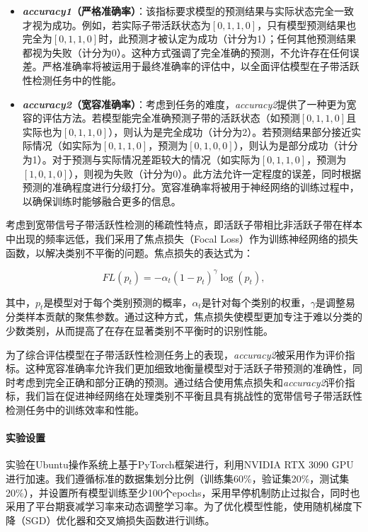\begin{itemize}
    \item \textbf{\textit{accuracy1}（严格准确率）}：该指标要求模型的预测结果与实际状态完全一致才视为成功。例如，若实际子带活跃状态为$[0, 1, 1, 0]$，只有模型预测结果也完全为$[0, 1, 1, 0]$时，此预测才被认定为成功（计分为1）；任何其他预测结果都视为失败（计分为0）。这种方式强调了完全准确的预测，不允许存在任何误差。严格准确率将被运用于最终准确率的评估中，以全面评估模型在子带活跃性检测任务中的性能。
    
    \item \textbf{\textit{accuracy2}（宽容准确率）}：考虑到任务的难度，\textit{accuracy2}提供了一种更为宽容的评估方法。若模型能完全准确预测子带的活跃状态（如预测$[0, 1, 1, 0]$且实际也为$[0, 1, 1, 0]$），则认为是完全成功（计分为2）。若预测结果部分接近实际情况（如实际为$[0, 1, 1, 0]$，预测为$[0, 1, 0, 0]$），则认为是部分成功（计分为1）。对于预测与实际情况差距较大的情况（如实际为$[0, 1, 1, 0]$，预测为$[1, 0, 1, 0]$），则视为失败（计分为0）。此方法允许一定程度的误差，同时根据预测的准确程度进行分级打分。宽容准确率将被用于神经网络的训练过程中，以确保训练时能够融合更多的信息。
\end{itemize}


考虑到宽带信号子带活跃性检测的稀疏性特点，即活跃子带相比非活跃子带在样本中出现的频率远低，我们采用了焦点损失（Focal Loss）作为训练神经网络的损失函数，以解决类别不平衡的问题。焦点损失的表达式为：

\begin{equation}
FL(p_t) = -\alpha_t (1 - p_t)^\gamma \log(p_t),
\end{equation}

其中，$p_t$是模型对于每个类别预测的概率，$\alpha_t$是针对每个类别的权重，$\gamma$是调整易分类样本贡献的聚焦参数。通过这种方式，焦点损失使模型更加专注于难以分类的少数类别，从而提高了在存在显著类别不平衡时的识别性能。

为了综合评估模型在子带活跃性检测任务上的表现，\textit{accuracy2}被采用作为评价指标。这种宽容准确率允许我们更加细致地衡量模型对于活跃子带预测的准确性，同时考虑到完全正确和部分正确的预测。通过结合使用焦点损失和\textit{accuracy2}评价指标，我们旨在促进神经网络在处理类别不平衡且具有挑战性的宽带信号子带活跃性检测任务中的训练效率和性能。


\paragraph{实验设置} 实验在Ubuntu操作系统上基于PyTorch框架进行，利用NVIDIA RTX 3090 GPU进行加速。我们遵循标准的数据集划分比例（训练集60\%，验证集20\%，测试集20\%），并设置所有模型训练至少100个epochs，采用早停机制防止过拟合，同时也采用了平台期衰减学习率来动态调整学习率。为了优化模型性能，使用随机梯度下降（SGD）优化器和交叉熵损失函数进行训练。


